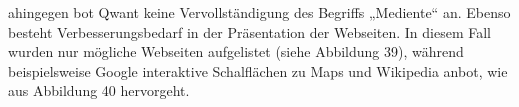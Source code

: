 \documentclass[11pt]{article}
\begin{document}
ahingegen bot Qwant keine Vervollständigung des Begriffs „Mediente“ an. Ebenso besteht Verbesserungsbedarf in der Präsentation
der Webseiten. In diesem Fall wurden nur mögliche Webseiten aufgelistet (siehe Abbildung 39), während beispielsweise Google
interaktive Schalflächen zu Maps und Wikipedia anbot, wie aus Abbildung 40 hervorgeht.
\end{document}
